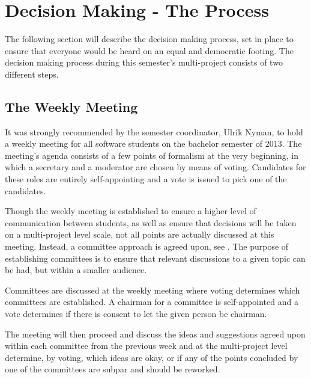 \section{Decision Making - The Process}
\label{sec:decisionmaking}

The following section will describe the decision making process, set in place to ensure that everyone would be heard on an equal and democratic footing. The decision making process during this semester's multi-project consists of two different steps.

\subsection{The Weekly Meeting}
\label{sub:theweeklymeeting}

It was strongly recommended by the semester coordinator, Ulrik Nyman, to hold a weekly meeting for all software students on the bachelor semester of 2013. The meeting's agenda consists of a few points of formalism at the very beginning, in which a secretary and a moderator are chosen by means of voting. Candidates for these roles are entirely self-appointing and a vote is issued to pick one of the candidates. %

Though the weekly meeting is established to ensure a higher level of communication between students, as well as ensure that decisions will be taken on a multi-project level scale, not all points are actually discussed at this meeting. Instead, a committee approach is agreed upon, see . The purpose of establishing committees is to ensure that relevant discussions to a given topic can be had, but within a smaller audience.

Committees are discussed at the weekly meeting where voting determines which committees are established. A chairman for a committee is self-appointed and a vote determines if there is consent to let the given person be chairman.

The meeting will then proceed and discuss the ideas and suggestions agreed upon within each committee from the previous week and at the multi-project level determine, by voting, which ideas are okay, or if any of the points concluded by one of the committees are subpar and should be reworked.

